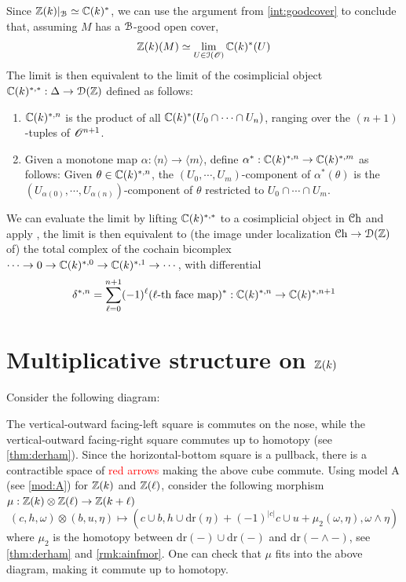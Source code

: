 \documentclass[10pt]{amsart}
\begin{document}
Since $\mathbb{Z}(k)|_{\mathcal{B}}\simeq\mathbb{C}(k)^*$, we can use the argument from \cref{int:goodcover} to conclude that, assuming $M$ has a $\mathcal{B}$-good open cover, 
\[
    {\mathbb{Z}}(k)(M)\simeq\lim_{U\in\mathcal{I}(\mathscr O)} \mathbb{C}(k)^*(U)
  \]
  The limit is then equivalent to the limit of the cosimplicial object $\mathbb{C}(k)^{*,*}:\Delta\to\mathcal{D}(\mathbb{Z})$ defined as follows:
  \begin{enumerate}
    \item $\mathbb{C}(k)^{*,n}$ is the product of all $\mathbb{C}(k)^*(U_0\cap\cdots\cap U_n)$, ranging over the $(n+1)$-tuples of $\mathscr{O}^{n+1}$. 
    \item Given a monotone map $\alpha:\langle n\rangle\to\langle m\rangle$, define $\alpha^*:\mathbb{C}(k)^{*,n}\to\mathbb{C}(k)^{*,m}$ as follows: Given $\theta\in\mathbb{C}(k)^{*,n}$, the $(U_0,\cdots,U_m)$-component of $\alpha^*(\theta)$ is the $(U_{\alpha(0)},\cdots,U_{\alpha(n)})$-component of $\theta$ restricted to $U_0\cap\cdots\cap U_m$.
  \end{enumerate}
  We can evaluate the limit by lifting $\mathbb{C}(k)^{*,*}$ to a cosimplicial object in $\mathcal{C}\mathrm{h}$ and apply \cite[Lemma 7.10]{bunkenikolausvoelkl2016diffcoh}, the limit is then equivalent to (the image under localization $\mathcal{C}\mathrm{h}\to\mathcal{D}(\mathbb{Z})$ of) the total complex of the cochain bicomplex $\cdots\to 0\to \mathbb{C}(k)^{*,0}\to\mathbb{C}(k)^{*,1}\to\cdots$, with differential \[\delta^{*,n}=\sum_{\ell=0}^{n+1}(-1)^\ell(\ell\mbox{-th face map})^*:\mathbb{C}(k)^{*,n}\to\mathbb{C}(k)^{*,n+1}\] 

\section{Multiplicative structure on \texorpdfstring{$\mathbb{Z}(k)$}{Z(k)}}

Consider the following diagram:
\begin{center}
\end{center}The vertical-outward facing-left square is commutes on the nose, while the vertical-outward facing-right square commutes up to homotopy (see \cref{thm:derham}). Since the horizontal-bottom square is a pullback, there is a contractible space of \textcolor{red}{red arrows} making the above cube commute. Using model A (see \cref{mod:A}) for $\mathbb{Z}(k)$ and $\mathbb{Z}(\ell)$, consider the following morphism $\mu:\mathbb{Z}(k)\otimes\mathbb{Z}(\ell)\to\mathbb{Z}(k+\ell)$ \[(c,h,\omega)\otimes(b,u,\eta)\mapsto(c\cup b,h\cup \mathrm{dr}(\eta)+(-1)^{|c|}c\cup u+\mu_2(\omega,\eta),\omega\wedge\eta)\]where $\mu_2$ is the homotopy between $\mathrm{dr}(-)\cup\mathrm{dr}(-)$ and $\mathrm{dr}(-\wedge-)$, see \cref{thm:derham} and \cref{rmk:ainfmor}. One can check that $\mu$ fits into the above diagram, making it commute up to homotopy. 


{\footnotesize


}
\end{document}
